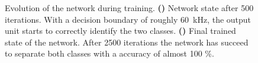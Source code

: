 \begin{figure}
	\begin{subfigure}{\textwidth}
		\caption{}
		\centering
		
		\label{learning_process_s500}
	\end{subfigure}
	\begin{subfigure}{\textwidth}
		\caption{}
		\centering
		
		\label{learning_process_s2500}
	\end{subfigure}
	\caption[Evolution of the network during training.]{Evolution of the network during training. \textbf{()} Network state after 500 iterations. With a decision boundary of roughly \SI{60}{\kilo \Hz}, the output unit starts to correctly identify the two classes. \textbf{()} Final trained state of the network. After 2500 iterations the network has succeed to separate both classes with a accuracy of almost 100 \%.}
\end{figure}

%    
